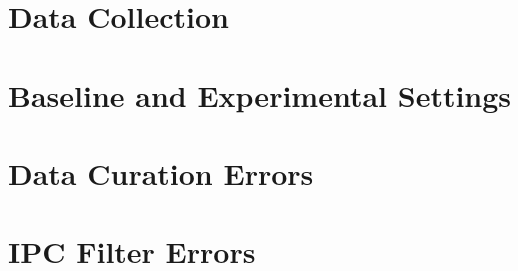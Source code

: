\section{Data Collection}
\label{sec:DataCollection}

\section{Baseline and Experimental Settings}
\label{sec:settings}

\section{Data Curation Errors}
\label{sec:DataCurationErrors}

\section{IPC Filter Errors}
\label{sec:IPCFilterErrors}
%



